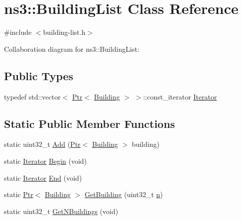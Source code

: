 \hypertarget{classns3_1_1BuildingList}{}\section{ns3\+:\+:Building\+List Class Reference}
\label{classns3_1_1BuildingList}


{\ttfamily \#include $<$building-\/list.\+h$>$}



Collaboration diagram for ns3\+:\+:Building\+List\+:
\subsection*{Public Types}
\begin{DoxyCompactItemize}
\item 
typedef std\+::vector$<$ \hyperlink{classns3_1_1Ptr}{Ptr}$<$ \hyperlink{classns3_1_1Building}{Building} $>$ $>$\+::const\+\_\+iterator \hyperlink{classns3_1_1BuildingList_a84957ecea4b4343f676da0e96f2c8130}{Iterator}
\end{DoxyCompactItemize}
\subsection*{Static Public Member Functions}
\begin{DoxyCompactItemize}
\item 
static uint32\+\_\+t \hyperlink{classns3_1_1BuildingList_a742f48290b35f9979c8d4d3dc9717948}{Add} (\hyperlink{classns3_1_1Ptr}{Ptr}$<$ \hyperlink{classns3_1_1Building}{Building} $>$ building)
\item 
static \hyperlink{classns3_1_1BuildingList_a84957ecea4b4343f676da0e96f2c8130}{Iterator} \hyperlink{classns3_1_1BuildingList_adbb122872e11541e930f0a3afa70a479}{Begin} (void)
\item 
static \hyperlink{classns3_1_1BuildingList_a84957ecea4b4343f676da0e96f2c8130}{Iterator} \hyperlink{classns3_1_1BuildingList_abc6b941dbb194efb9f00352cc6b3db65}{End} (void)
\item 
static \hyperlink{classns3_1_1Ptr}{Ptr}$<$ \hyperlink{classns3_1_1Building}{Building} $>$ \hyperlink{classns3_1_1BuildingList_a206588dcc04671d3607381622233d0e0}{Get\+Building} (uint32\+\_\+t \hyperlink{lte__link__budget__x2__handover__measures_8m_abdb05bc5a064cf642a06c83b3392f148}{n})
\item 
static uint32\+\_\+t \hyperlink{classns3_1_1BuildingList_a80e3d43b64f35c4f98ecfcef9a5d9a9c}{Get\+N\+Buildings} (void)
\end{DoxyCompactItemize}


